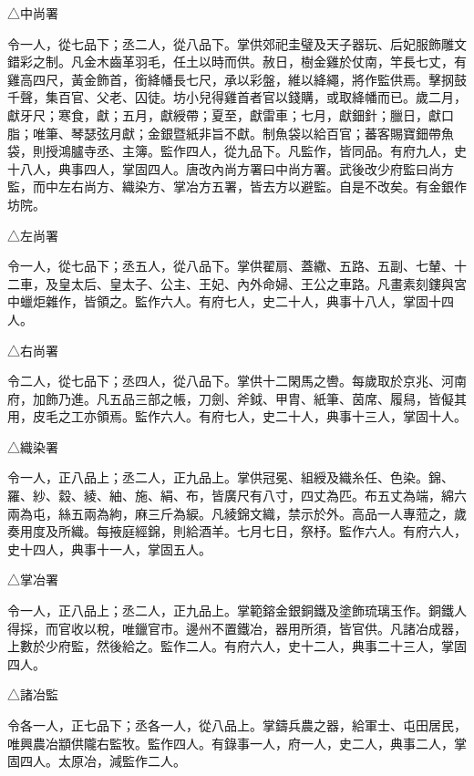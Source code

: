 \begin{pinyinscope}
 △中尚署



 令一人，從七品下；丞二人，從八品下。掌供郊祀圭璧及天子器玩、后妃服飾雕文錯彩之制。凡金木齒革羽毛，任土以時而供。赦日，樹金雞於仗南，竿長七丈，有雞高四尺，黃金飾首，銜絳幡長七尺，承以彩盤，維以絳繩，將作監供焉。擊㧏鼓千聲，集百官、父老、囚徒。坊小兒得雞首者官以錢購，或取絳幡而已。歲二月，獻牙尺；寒食，獻；五月，獻綬帶；夏至，獻雷車；七月，獻鈿針；臘日，獻口脂；唯筆、琴瑟弦月獻；金銀暨紙非旨不獻。制魚袋以給百官；蕃客賜寶鈿帶魚袋，則授鴻臚寺丞、主簿。監作四人，從九品下。凡監作，皆同品。有府九人，史十八人，典事四人，掌固四人。唐改內尚方署曰中尚方署。武後改少府監曰尚方監，而中左右尚方、織染方、掌冶方五署，皆去方以避監。自是不改矣。有金銀作坊院。



 △左尚署



 令一人，從七品下；丞五人，從八品下。掌供翟扇、蓋繖、五路、五副、七輦、十二車，及皇太后、皇太子、公主、王妃、內外命婦、王公之車路。凡畫素刻鏤與宮中蠟炬雜作，皆領之。監作六人。有府七人，史二十人，典事十八人，掌固十四人。



 △右尚署



 令二人，從七品下；丞四人，從八品下。掌供十二閑馬之轡。每歲取於京兆、河南府，加飾乃進。凡五品三部之帳，刀劍、斧鉞、甲胄、紙筆、茵席、履舄，皆儗其用，皮毛之工亦領焉。監作六人。有府七人，史二十人，典事十三人，掌固十人。



 △織染署



 令一人，正八品上；丞二人，正九品上。掌供冠冕、組綬及織糸任、色染。錦、羅、紗、縠、綾、紬、施、絹、布，皆廣尺有八寸，四丈為匹。布五丈為端，綿六兩為屯，絲五兩為絇，麻三斤為綟。凡綾錦文織，禁示於外。高品一人專蒞之，歲奏用度及所織。每掖庭經錦，則給酒羊。七月七日，祭杼。監作六人。有府六人，史十四人，典事十一人，掌固五人。



 △掌冶署



 令一人，正八品上；丞二人，正九品上。掌範鎔金銀銅鐵及塗飾琉璃玉作。銅鐵人得採，而官收以稅，唯鑞官市。邊州不置鐵冶，器用所須，皆官供。凡諸冶成器，上數於少府監，然後給之。監作二人。有府六人，史十二人，典事二十三人，掌固四人。



 △諸冶監



 令各一人，正七品下；丞各一人，從八品上。掌鑄兵農之器，給軍士、屯田居民，唯興農冶顓供隴右監牧。監作四人。有錄事一人，府一人，史二人，典事二人，掌固四人。太原冶，減監作二人。




\end{pinyinscope}
